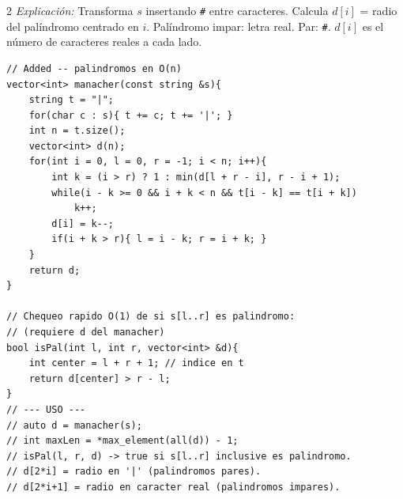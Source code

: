 \documentclass[10pt,a4paper]{article}
\begin{document}
\begin{multicols}{2}
\textit{Explicaci\'on:} Transforma $s$ insertando \texttt{\#} entre caracteres. Calcula $d[i]$ = radio del pal\'indromo centrado en $i$. Pal\'indromo impar: letra real. Par: \texttt{\#}. $d[i]$ es el n\'umero de caracteres reales a cada lado.

\begin{lstlisting}
// Added -- palindromos en O(n)
vector<int> manacher(const string &s){
    string t = "|";
    for(char c : s){ t += c; t += '|'; }
    int n = t.size();
    vector<int> d(n);
    for(int i = 0, l = 0, r = -1; i < n; i++){
        int k = (i > r) ? 1 : min(d[l + r - i], r - i + 1);
        while(i - k >= 0 && i + k < n && t[i - k] == t[i + k])
            k++;
        d[i] = k--;
        if(i + k > r){ l = i - k; r = i + k; }
    }
    return d;
}

// Chequeo rapido O(1) de si s[l..r] es palindromo:
// (requiere d del manacher)
bool isPal(int l, int r, vector<int> &d){
    int center = l + r + 1; // indice en t
    return d[center] > r - l;
}
// --- USO ---
// auto d = manacher(s);
// int maxLen = *max_element(all(d)) - 1;
// isPal(l, r, d) -> true si s[l..r] inclusive es palindromo.
// d[2*i] = radio en '|' (palindromos pares).
// d[2*i+1] = radio en caracter real (palindromos impares).
\end{lstlisting}


\end{multicols}
\newpage
\end{document}
